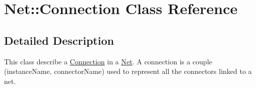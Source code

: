 \hypertarget{class_net_1_1_connection}{}\section{Net\+:\+:Connection Class Reference}
\label{class_net_1_1_connection}


\subsection{Detailed Description}
This class describe a \mbox{\hyperlink{class_net_1_1_connection}{Connection}} in a \mbox{\hyperlink{class_net}{Net}}. A connection is a couple (instance\+Name, connector\+Name) used to represent all the connectors linked to a net. 